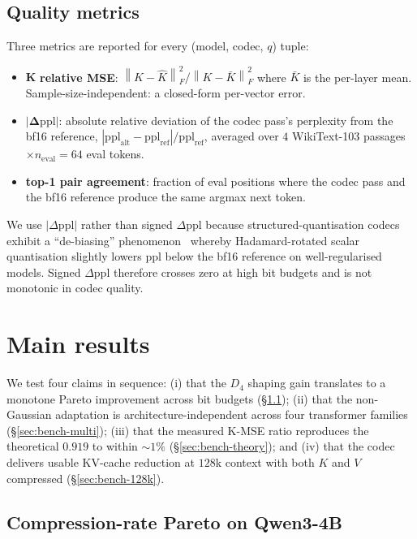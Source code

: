 \documentclass[11pt,a4paper]{article}
\theoremstyle{definition}
\theoremstyle{plain}
\newcommand{\norm}[1]{\left\lVert#1\right\rVert}
\begin{document}
\subsection{Quality metrics}

Three metrics are reported for every (model, codec, $q$) tuple:

\begin{itemize}[leftmargin=*]
  \item $\boldsymbol{K}$ \textbf{relative MSE}: $\norm{K-\hat K}_F^2 / \norm{K - \bar K}_F^2$
    where $\bar K$ is the per-layer mean. Sample-size-independent:
    a closed-form per-vector error.
  \item $\boldsymbol{|\Delta\mathrm{ppl}|}$: absolute relative deviation of
    the codec pass's perplexity from the bf16 reference,
    $|\mathrm{ppl}_\mathrm{alt}-\mathrm{ppl}_\mathrm{ref}|/\mathrm{ppl}_\mathrm{ref}$,
    averaged over $4$ WikiText-103 passages $\times n_\mathrm{eval}=64$
    eval tokens.
  \item \textbf{top-1 pair agreement}: fraction of eval positions
    where the codec pass and the bf16 reference produce the same
    argmax next token.
\end{itemize}

We use $|\Delta\mathrm{ppl}|$ rather than signed $\Delta\mathrm{ppl}$
because structured-quantisation codecs exhibit a ``de-biasing''
phenomenon~\cite{quip-sharp} whereby Hadamard-rotated scalar
quantisation slightly lowers ppl below the bf16 reference on
well-regularised models. Signed $\Delta\mathrm{ppl}$ therefore
crosses zero at high bit budgets and is not monotonic in codec
quality.

\section{Main results}
\label{sec:benchmarks}

We test four claims in sequence: (i) that the $D_4$ shaping gain
translates to a monotone Pareto improvement across bit budgets
(\S\ref{sec:bench-pareto}); (ii) that the non-Gaussian adaptation
is architecture-independent across four transformer families
(\S\ref{sec:bench-multi}); (iii) that the measured K-MSE ratio
reproduces the theoretical $0.919$ to within $\sim\!1\%$
(\S\ref{sec:bench-theory}); and (iv) that the codec delivers usable
KV-cache reduction at $128$k context with both $K$ and $V$
compressed (\S\ref{sec:bench-128k}).

\subsection{Compression-rate Pareto on Qwen3-4B}
\label{sec:bench-pareto}
\end{document}
